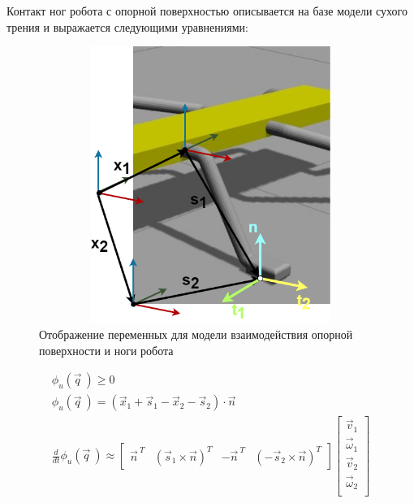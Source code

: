 Контакт ног робота с опорной поверхностью  описывается на базе модели сухого трения и выражается следующими уравнениями:

\begin{figure}[H]
    \centering\includegraphics[height=9cm,width=1\textwidth,keepaspectratio]{images/Strirus_leg.drawio.png}
    \caption{Отображение переменных для модели взаимодействия опорной поверхности и ноги робота}
    \label{fig:contact_interaction.png}
\end{figure}

\begin{align}
    \label{eq:contact_inter}
    \phi_u(\vec{q}\ ) \geqslant 0 \\ 
                        \phi_u(\vec{q}\ ) = (\vec{x}_1 + \vec{s}_1 - \vec{x}_2 - \vec{s}_2) \cdot \vec{n} \\
                        \frac{d }{d t}\phi_u(\vec{q}\ ) \approx \begin{bmatrix}
                            \vec{n}^{\ T} & (\vec{s}_1 \times \vec{n})^T & -\vec{n}^{\ T} & (-\vec{s}_2 \times \vec{n})^T
                        \end{bmatrix} \begin{bmatrix}
                            \vec{v}_1\\ 
                        \vec{\omega}_1\\ 
                        \vec{v}_2\\
                        \vec{\omega}_2\\
                        \end{bmatrix}
\end{align} 

